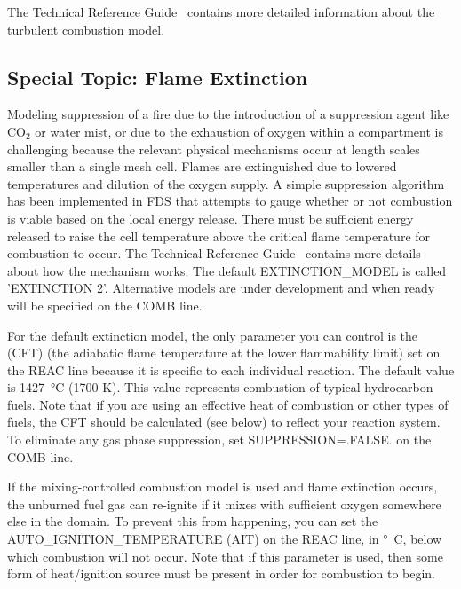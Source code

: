 \documentclass[11pt]{book}
\begin{document}
The Technical Reference Guide~\cite{FDS_Math_Guide} contains more detailed information about the turbulent combustion model.

\subsection{Special Topic: Flame Extinction}
\label{info:extinction}

Modeling suppression of a fire due to the introduction of a suppression agent like CO$_2$ or water mist, or due to the exhaustion of oxygen within a compartment is challenging because the relevant physical mechanisms occur at length scales smaller than a single mesh cell. Flames are extinguished due to lowered temperatures and dilution of the oxygen supply. A simple suppression algorithm has been implemented in FDS that attempts to gauge whether or not combustion is viable based on the local energy release. There must be sufficient energy released to raise the cell temperature above the critical flame temperature for combustion to occur. The Technical Reference Guide~\cite{FDS_Math_Guide} contains more details about how the mechanism works. The default {\ct EXTINCTION\_MODEL} is called {\ct 'EXTINCTION 2'}. Alternative models are under development and when ready will be specified on the {\ct COMB} line.

For the default extinction model, the only parameter you can control is the  (CFT) (the adiabatic flame temperature at the lower flammability limit) set on the {\ct REAC} line because it is specific to each individual reaction. The default value is 1427~\si{\degreeCelsius} (1700 K). This value represents combustion of typical hydrocarbon fuels. Note that if you are using an effective heat of combustion or other types of fuels, the CFT should be calculated (see below) to reflect your reaction system. To eliminate any gas phase suppression, set {\ct SUPPRESSION=.FALSE.} on the {\ct COMB} line.

If the mixing-controlled combustion model is used and flame extinction occurs, the unburned fuel gas can re-ignite if it mixes with sufficient oxygen somewhere else in the domain. To prevent this from happening, you can set the {\ct AUTO\_IGNITION\_TEMPERATURE} (AIT) on the {\ct REAC} line, in \si{\degree C}, below which combustion will not occur. Note that if this parameter is used, then some form of heat/ignition source must be present in order for combustion to begin.
\end{document}
